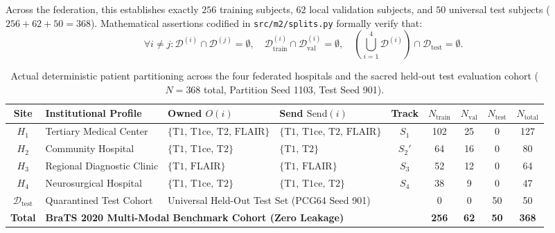\documentclass[10pt,a4paper]{article}
\begin{document}
\noindent Across the federation, this establishes exactly $256$ training subjects, $62$ local validation subjects, and $50$ universal test subjects ($256 + 62 + 50 = 368$). Mathematical assertions codified in \texttt{src/m2/splits.py} formally verify that:
\begin{equation}
\forall i \neq j: \mathcal{D}^{(i)} \cap \mathcal{D}^{(j)} = \emptyset, \quad \mathcal{D}_{\text{train}}^{(i)} \cap \mathcal{D}_{\text{val}}^{(i)} = \emptyset, \quad \left(\bigcup_{i=1}^4 \mathcal{D}^{(i)}\right) \cap \mathcal{D}_{\text{test}} = \emptyset.
\end{equation}

\begin{table}[h]
\centering
\small
\setlength{\tabcolsep}{3.5pt}
\renewcommand{\arraystretch}{1.15}
\begin{tabularx}{\textwidth}{c X l l c c c c c}
\toprule
\textbf{Site} & \textbf{Institutional Profile} & \textbf{Owned} $O(i)$ & \textbf{Send} $\text{Send}(i)$ & \textbf{Track} & $N_{\text{train}}$ & $N_{\text{val}}$ & $N_{\text{test}}$ & $N_{\text{total}}$ \\
\midrule
$H_1$ & Tertiary Medical Center & $\{\text{T1, T1ce, T2, FLAIR}\}$ & $\{\text{T1, T1ce, T2, FLAIR}\}$ & $S_1$ & 102 & 25 & 0 & 127 \\
$H_2$ & Community Hospital & $\{\text{T1, T1ce, T2}\}$ & $\{\text{T1, T2}\}$ & $S_2'$ & 64 & 16 & 0 & 80 \\
$H_3$ & Regional Diagnostic Clinic & $\{\text{T1, FLAIR}\}$ & $\{\text{T1, FLAIR}\}$ & $S_3$ & 52 & 12 & 0 & 64 \\
$H_4$ & Neurosurgical Hospital & $\{\text{T1, T1ce, T2}\}$ & $\{\text{T1, T1ce, T2}\}$ & $S_4$ & 38 & 9 & 0 & 47 \\
\midrule
$\mathcal{D}_{\text{test}}$ & Quarantined Test Cohort & \multicolumn{3}{l}{Universal Held-Out Test Set (PCG64 Seed 901)} & 0 & 0 & 50 & 50 \\
\midrule
\textbf{Total} & \multicolumn{4}{l}{\textbf{BraTS 2020 Multi-Modal Benchmark Cohort (Zero Leakage)}} & \textbf{256} & \textbf{62} & \textbf{50} & \textbf{368} \\
\bottomrule
\end{tabularx}
\caption{Actual deterministic patient partitioning across the four federated hospitals and the sacred held-out test evaluation cohort ($N = 368$ total, Partition Seed 1103, Test Seed 901).}
\label{tab:actual_datasplit}
\end{table}
\end{document}
